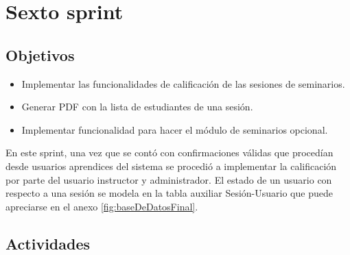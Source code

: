 ﻿\section{Sexto sprint} %
\label{sec:sexto_sprint}

\subsection{Objetivos}

\begin{itemize}
	\item Implementar las funcionalidades de calificación de las sesiones de seminarios.
	\item Generar PDF con la lista de estudiantes de una sesión.
	\item Implementar funcionalidad para hacer el módulo de seminarios opcional.
\end{itemize}

En este sprint, una vez que se contó con confirmaciones válidas que procedían desde usuarios aprendices del sistema se procedió a implementar la calificación por parte del usuario instructor y administrador. El estado de un usuario con respecto a una sesión se modela en la tabla auxiliar Sesión-Usuario que puede apreciarse en el anexo \ref{fig:baseDeDatosFinal}.

\subsection{Actividades} %
\label{sub:actividades6}

